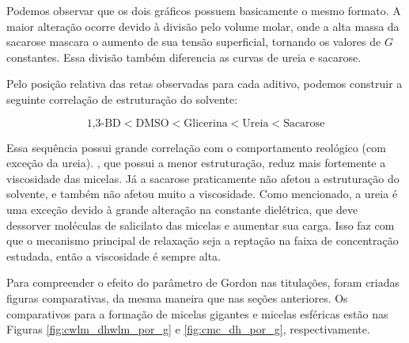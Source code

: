 		Podemos observar que os dois gráficos possuem basicamente o mesmo formato. A maior alteração ocorre devido à divisão pelo volume molar, onde a alta massa da sacarose mascara o aumento de sua tensão superficial, tornando os valores de \(G\) constantes. Essa divisão também diferencia as curvas de ureia e sacarose.
		
		Pelo posição relativa das retas observadas para cada aditivo, podemos construir a seguinte correlação de estruturação do solvente:
		
		\begin{equation*}
			\textrm{1,3-BD} < \textrm{DMSO} < \textrm{Glicerina} < \textrm{Ureia} < \textrm{Sacarose}
		\end{equation*}
		
		Essa sequência possui grande correlação com o comportamento reológico (com exceção da ureia). \BD, que possui a menor estruturação, reduz mais fortemente a viscosidade das micelas. Já a sacarose praticamente não afetou a estruturação do solvente, e também não afetou muito a viscosidade. Como mencionado, a ureia é uma exceção devido à grande alteração na constante dielétrica, que deve dessorver moléculas de salicilato das micelas e aumentar sua carga. Isso faz com que o mecanismo principal de relaxação seja a reptação na faixa de concentração estudada, então a viscosidade é sempre alta.
		
		Para compreender o efeito do parâmetro de Gordon nas titulações, foram criadas figuras comparativas, da mesma maneira que nas seções anteriores. Os comparativos para a formação de micelas gigantes e micelas esféricas estão nas Figuras \ref{fig:cwlm_dhwlm_por_g} e \ref{fig:cmc_dh_por_g}, respectivamente.
		
